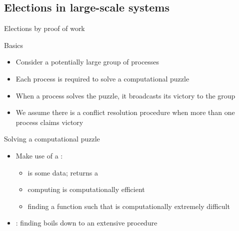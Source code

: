 \subsection{Elections in large-scale systems}
\begin{slide}{Elections by proof of work}
  \begin{block}{Basics}
    \begin{itemize}\firmlist
    \item Consider a potentially large group of processes
    \item Each process is required to solve a computational puzzle
    \item When a process solves the puzzle, it broadcasts its victory to the group
    \item We assume there is a conflict resolution procedure when more than one process claims victory
    \end{itemize}
  \end{block}
  \begin{block}{Solving a computational puzzle}
    \begin{itemize}
    \item Make use of a  :
      \begin{itemize}
      \item {} is some data;  returns a 
      \item computing  is computationally efficient
      \item finding a function  such that  is computationally
        extremely difficult
      \end{itemize}
    \item {}: finding  boils down to an extensive 
      procedure
    \end{itemize}
  \end{block}
\end{slide}
